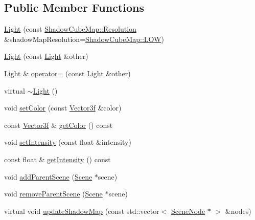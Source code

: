 \subsection*{Public Member Functions}
\begin{DoxyCompactItemize}
\item 
\hyperlink{classburn_1_1_light_afce0bc148b2741af68a59b7ce4938b08}{Light} (const \hyperlink{classburn_1_1_shadow_cube_map_a199f4c817b2cadb4f3b93c270c4f209e}{Shadow\-Cube\-Map\-::\-Resolution} \&shadow\-Map\-Resolution=\hyperlink{classburn_1_1_shadow_cube_map_a199f4c817b2cadb4f3b93c270c4f209ea04beb22bfc324a3458294be49d313c9c}{Shadow\-Cube\-Map\-::\-L\-O\-W})
\item 
\hyperlink{classburn_1_1_light_adaa47f7f4395a7ef12f78669a5694382}{Light} (const \hyperlink{classburn_1_1_light}{Light} \&other)
\item 
\hyperlink{classburn_1_1_light}{Light} \& \hyperlink{classburn_1_1_light_af49541104082b6f6c0f93cc4ff4161b5}{operator=} (const \hyperlink{classburn_1_1_light}{Light} \&other)
\item 
virtual \hyperlink{classburn_1_1_light_af0622c23bba106043efff05e027d1e04}{$\sim$\-Light} ()
\item 
void \hyperlink{classburn_1_1_light_a6178f2826887a4aba596523b3e001604}{set\-Color} (const \hyperlink{namespaceburn_afdd7cfb352b9612432faf6947b6fff74}{Vector3f} \&color)
\item 
const \hyperlink{namespaceburn_afdd7cfb352b9612432faf6947b6fff74}{Vector3f} \& \hyperlink{classburn_1_1_light_a0b43e6f4a60eed5ed3ff2f7a01d350eb}{get\-Color} () const 
\item 
void \hyperlink{classburn_1_1_light_a798ae7d682b85dcede11a89047f19508}{set\-Intensity} (const float \&intensity)
\item 
const float \& \hyperlink{classburn_1_1_light_ac5083292da85b9514dfa52ec933a563c}{get\-Intensity} () const 
\item 
void \hyperlink{classburn_1_1_light_ad1c8b2a8ff0af362741b01fa5873c683}{add\-Parent\-Scene} (\hyperlink{classburn_1_1_scene}{Scene} $\ast$scene)
\item 
void \hyperlink{classburn_1_1_light_a320f27149a8e49a1d2b563e423e9636c}{remove\-Parent\-Scene} (\hyperlink{classburn_1_1_scene}{Scene} $\ast$scene)
\item 
virtual void \hyperlink{classburn_1_1_light_af14d6771a1b6ff04195467f5c1c6a312}{update\-Shadow\-Map} (const std\-::vector$<$ \hyperlink{classburn_1_1_scene_node}{Scene\-Node} $\ast$ $>$ \&nodes)
\item 

\end{DoxyCompactItemize}
